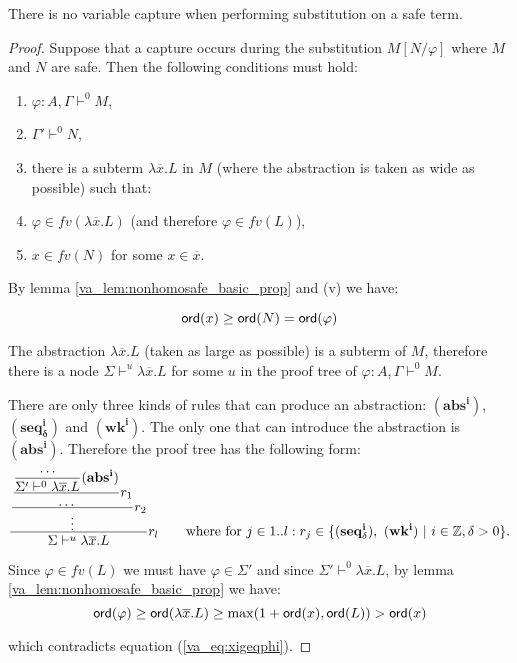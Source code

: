 \begin{lem}
\label{va_lem:noclash}
There is no variable capture when performing substitution on a safe term.
\end{lem}
\begin{proof}
Suppose that a capture occurs during the substitution $M[N/\varphi]$
where $M$ and $N$ are safe. Then the following conditions must hold:
\begin{enumerate}
\item $\varphi:A, \Gamma \vdash^0 M$,
\item $\Gamma' \vdash^0 N$,
\item there is a subterm $\lambda \overline{x} . L$ in $M$ (where the abstraction is taken as wide as possible) such that:
\item $\varphi \in fv(\lambda \overline{x} . L)$ (and therefore $\varphi \in fv(L)$),
\item $x \in fv(N)$ for some $x \in \overline{x}$.
\end{enumerate}

By lemma \ref{va_lem:nonhomosafe_basic_prop} and (v) we have:

\begin{equation}
{\sf ord}(x) \geq {\sf ord}(N) = {\sf ord}(\varphi) \label{va_eq:xigeqphi}
\end{equation}

The abstraction $\lambda \overline{x} . L$ (taken as large as possible)
is a subterm of $M$, therefore there is a node $\Sigma \vdash^u \lambda \overline{x} . L$  for some $u$ in the
proof tree of $\varphi:A, \Gamma \vdash^0 M$.

There are only three kinds of rules that can produce an abstraction:
$\mathbf{(abs^i)}$, $\mathbf{(seq^i_\delta)}$ and $\mathbf{(wk^i)}$.
The only one that can introduce the abstraction is
$\mathbf{(abs^i)}$. Therefore the proof tree has the following form:
$$ \frac{\displaystyle 
    \frac{\displaystyle 
        \frac{\displaystyle 
            \frac{\displaystyle \ldots}{\Sigma' \vdash^0 \lambda \overline{x} . L} \mathbf{(abs^i)}
        }{\ldots} r_1
    }{\vdots} r_2
    }{ \Sigma \vdash^u \lambda \overline{x} . L } r_l
    \qquad \mbox{where for } j\in 1..l: r_j \in \{ \mathbf{(seq^i_\delta)},\ \mathbf{(wk^i)}\ |\ i \in \mathbb{Z}, \delta > 0 \}.
$$


Since $\varphi \in fv (L)$ we must have $\varphi \in \Sigma'$ and
since $\Sigma' \vdash^0 \lambda \overline{x} . L$, by lemma
\ref{va_lem:nonhomosafe_basic_prop} we have:
$${\sf ord}(\varphi) \geq {\sf ord}(\lambda \overline{x} . L) \geq \max(1+ {\sf ord}(x), {\sf ord}(L)) > {\sf ord}(x)$$

which contradicts equation (\ref{va_eq:xigeqphi}).
\end{proof}

